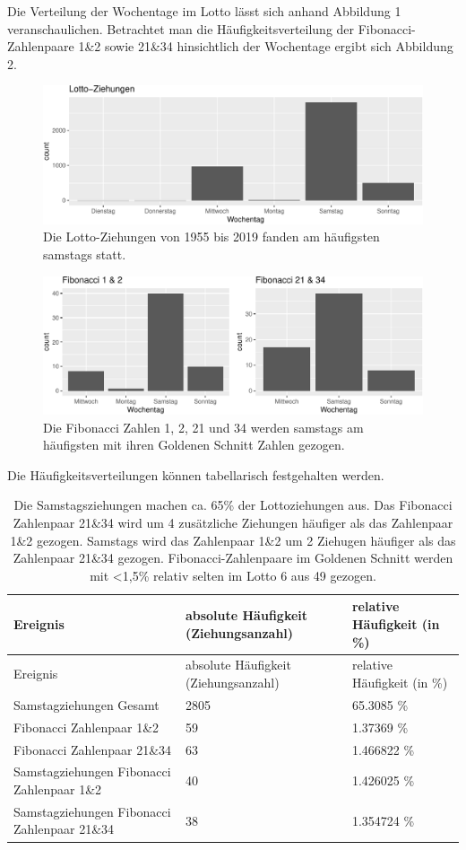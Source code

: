 \documentclass[ngerman,]{article}
\begin{document}
Die Verteilung der Wochentage im Lotto lässt sich anhand Abbildung 1
veranschaulichen. Betrachtet man die Häufigkeitsverteilung der
Fibonacci-Zahlenpaare 1\&2 sowie 21\&34 hinsichtlich der Wochentage
ergibt sich Abbildung 2.

\begin{figure}

\includegraphics{Abbildung/unnamed-chunk-2-1} \hfill{}

\caption{Die Lotto-Ziehungen von 1955 bis 2019 fanden am häufigsten samstags statt.}\label{fig:unnamed-chunk-2}
\end{figure}

\begin{figure}

\includegraphics{Abbildung/unnamed-chunk-3-1} \hfill{}

\caption{Die Fibonacci Zahlen 1, 2, 21 und 34 werden samstags am häufigsten mit ihren Goldenen Schnitt Zahlen gezogen.}\label{fig:unnamed-chunk-3}
\end{figure}

Die Häufigkeitsverteilungen können tabellarisch festgehalten werden.

\begin{longtable}[]{@{}lll@{}}
\caption{Die Samstagsziehungen machen ca. 65\% der Lottoziehungen aus.
Das Fibonacci Zahlenpaar 21\&34 wird um 4 zusätzliche Ziehungen häufiger
als das Zahlenpaar 1\&2 gezogen. Samstags wird das Zahlenpaar 1\&2 um 2
Ziehugen häufiger als das Zahlenpaar 21\&34 gezogen.
Fibonacci-Zahlenpaare im Goldenen Schnitt werden mit \textless{}1,5\%
relativ selten im Lotto 6 aus 49 gezogen.}\tabularnewline
\toprule
Ereignis & absolute Häufigkeit (Ziehungsanzahl) & relative Häufigkeit
(in \%)\tabularnewline
\midrule
\endfirsthead
\toprule
Ereignis & absolute Häufigkeit (Ziehungsanzahl) & relative Häufigkeit
(in \%)\tabularnewline
\midrule
\endhead
Samstagziehungen Gesamt & 2805 & 65.3085 \%\tabularnewline
Fibonacci Zahlenpaar 1\&2 & 59 & 1.37369 \%\tabularnewline
Fibonacci Zahlenpaar 21\&34 & 63 & 1.466822 \%\tabularnewline
Samstagziehungen Fibonacci Zahlenpaar 1\&2 & 40 & 1.426025
\%\tabularnewline
Samstagziehungen Fibonacci Zahlenpaar 21\&34 & 38 & 1.354724
\%\tabularnewline
\bottomrule
\end{longtable}
\end{document}
